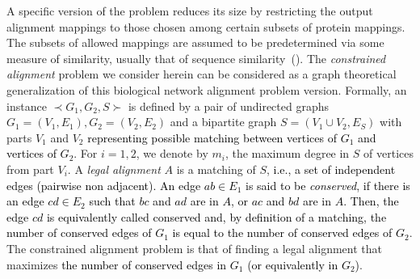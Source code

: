 \documentclass[final]{dmtcs-episciences}
\newcommand\mar[1]{\textcolor{black}{#1}}
\begin{document}
A specific version of the problem
reduces its size by restricting the output alignment mappings to those 
chosen among certain subsets of protein mappings. The subsets of allowed mappings are assumed 
to be predetermined via some measure of similarity, usually that of sequence similarity~(\citet{AbakaBE13,ZaslavskiyBV09}). 
The  \emph{ constrained alignment} problem we consider herein can be considered as a graph theoretical generalization 
of this biological network alignment problem version. 
Formally, an instance $\prec G_1,G_2,S \succ$ is defined by  a pair of undirected graphs $G_1=(V_1,E_1), G_2=(V_2,E_2)$ and a bipartite graph $S=(V_1\cup V_2,E_S)$ with parts $V_1$ and $V_2$ \mar{representing possible matching between vertices of $G_1$ and vertices of $G_2$}. For $i=1,2$, we denote by $m_i$, the maximum degree in $S$ of vertices from part $V_i$.  
A  \emph{ legal alignment} $A$ is a matching of $S$, \mar{i.e., a set of independent edges (pairwise non adjacent). An edge $ab\in E_1$  is said to be {\em conserved}, if there is an edge $cd\in E_2$ such that $bc$ and $ad$ are in $A$, or $ac$ and $bd$ are in $A$. Then, the edge $cd$ is equivalently called conserved and, by definition of a matching, the number of conserved edges of $G_1$ is equal to the number of conserved edges of $G_2$}.
The constrained alignment problem is that of finding a legal alignment that 
maximizes \mar{the number of conserved edges in $G_1$ (or equivalently in $G_2$)}. 
\end{document}
